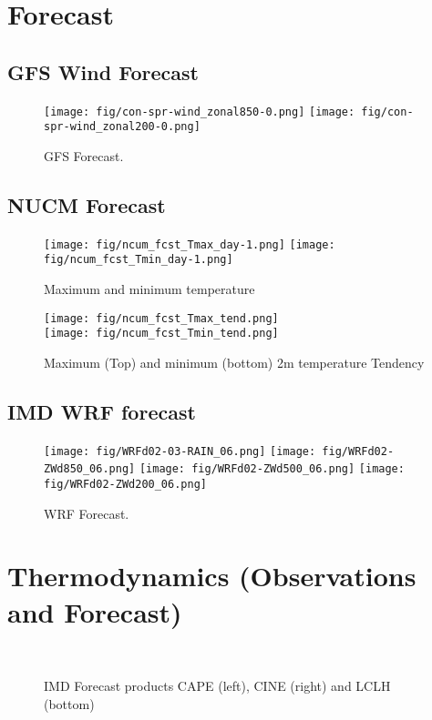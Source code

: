 \documentclass[10pt,a4paper]{article} %
\begin{document}
\section{Forecast}
\subsection{GFS Wind Forecast}

\begin{figure}[H]
\centering
\texttt{[image: fig/con-spr-wind\_zonal850-0.png]}
\texttt{[image: fig/con-spr-wind\_zonal200-0.png]}
\caption{GFS Forecast.}
\end{figure}


\subsection{NUCM Forecast}
\begin{figure}[H]
\centering
\texttt{[image: fig/ncum\_fcst\_Tmax\_day-1.png]}
\texttt{[image: fig/ncum\_fcst\_Tmin\_day-1.png]}
\caption{Maximum and minimum temperature}
\end{figure}


\begin{figure}[H]
\centering
\texttt{[image: fig/ncum\_fcst\_Tmax\_tend.png]}\\
\vskip 0.5cm
\texttt{[image: fig/ncum\_fcst\_Tmin\_tend.png]}
\caption{Maximum (Top) and minimum (bottom) 2m temperature Tendency}
\end{figure}



\subsection{IMD WRF forecast}

\begin{figure}[H]
\centering
\texttt{[image: fig/WRFd02-03-RAIN\_06.png]}
\texttt{[image: fig/WRFd02-ZWd850\_06.png]}
\texttt{[image: fig/WRFd02-ZWd500\_06.png]}
\texttt{[image: fig/WRFd02-ZWd200\_06.png]}
\caption{WRF Forecast.}
\end{figure}







\section{Thermodynamics (Observations and Forecast) }
\begin{figure}[H]
\centering
{} \hskip 0.1cm
%
\\
\vskip 0.1cm
\caption{IMD Forecast products CAPE (left), CINE (right) and  LCLH (bottom)}
\end{figure}
\end{document}
